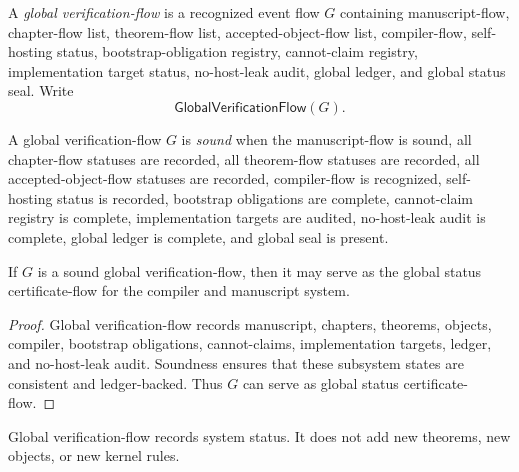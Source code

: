 \begin{definition}
\label{def:self-hosting-global-verification-flow}
A \emph{global verification-flow} is a recognized event flow $G$ containing manuscript-flow, chapter-flow list, theorem-flow list, accepted-object-flow list, compiler-flow, self-hosting status, bootstrap-obligation registry, cannot-claim registry, implementation target status, no-host-leak audit, global ledger, and global status seal. Write
$$
  \mathsf{GlobalVerificationFlow}(G).
$$
\end{definition}

\begin{definition}
\label{def:self-hosting-global-verification-soundness}
A global verification-flow $G$ is \emph{sound} when the manuscript-flow is sound, all chapter-flow statuses are recorded, all theorem-flow statuses are recorded, all accepted-object-flow statuses are recorded, compiler-flow is recognized, self-hosting status is recorded, bootstrap obligations are complete, cannot-claim registry is complete, implementation targets are audited, no-host-leak audit is complete, global ledger is complete, and global seal is present.
\end{definition}

\begin{theorem}
\label{thm:self-hosting-global-verification-status}
If $G$ is a sound global verification-flow, then it may serve as the global status certificate-flow for the compiler and manuscript system.
\end{theorem}

\begin{proof}
Global verification-flow records manuscript, chapters, theorems, objects, compiler, bootstrap obligations, cannot-claims, implementation targets, ledger, and no-host-leak audit. Soundness ensures that these subsystem states are consistent and ledger-backed. Thus $G$ can serve as global status certificate-flow.
\end{proof}

\begin{corollary}
\label{cor:self-hosting-global-verification-no-new-math}
Global verification-flow records system status. It does not add new theorems, new objects, or new kernel rules.
\end{corollary}

